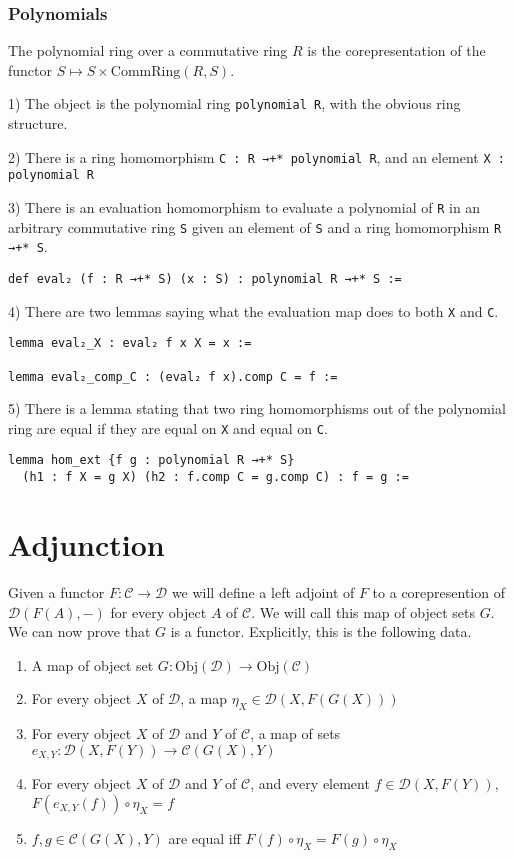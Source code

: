 \documentclass[12pt]{article} %
\theoremstyle{definition}
\theoremstyle{definition}
\theoremstyle{definition}
\theoremstyle{definition}
\begin{document}
\subsubsection{Polynomials}
The polynomial ring over a commutative ring $R$ is the corepresentation of the functor 
$S \mapsto S \times \text{CommRing}(R, S)$.

1) The object is the polynomial ring \lstinline{polynomial R}, with the obvious ring structure.

2) There is a ring homomorphism \lstinline{C : R →+* polynomial R}, and an element 
\lstinline{X : polynomial R}

3) There is an evaluation homomorphism to evaluate a polynomial of \lstinline{R} in 
an arbitrary commutative ring \lstinline{S} given an element of \lstinline{S} and 
a ring homomorphism \lstinline{R →+* S}.
\begin{lstlisting}
def eval₂ (f : R →+* S) (x : S) : polynomial R →+* S :=
\end{lstlisting}

4) There are two lemmas saying what the evaluation map does to both \lstinline{X} and 
\lstinline{C}.
\begin{lstlisting}
lemma eval₂_X : eval₂ f x X = x :=

lemma eval₂_comp_C : (eval₂ f x).comp C = f :=
\end{lstlisting}

5) There is a lemma stating that two ring homomorphisms out of the polynomial ring are 
equal if they are equal on \lstinline{X} and equal on \lstinline{C}.
\begin{lstlisting}
lemma hom_ext {f g : polynomial R →+* S} 
  (h1 : f X = g X) (h2 : f.comp C = g.comp C) : f = g :=
\end{lstlisting}

\section{Adjunction}

Given a functor $F : \mathcal{C} \to \mathcal{D}$ we will define a left adjoint of $F$ to 
a corepresention of $\mathcal{D}(F(A),-)$ for every object $A$ of $\mathcal{C}$. We will call
this map of object sets $G$. We can now prove that $G$ is a functor. Explicitly,
this is the following data.

\begin{enumerate}
  \item A map of object set $G : \text{Obj}(\mathcal{D})\to \text{Obj}(\mathcal{C})$
  \item For every object $X$ of $\mathcal{D}$, a map $\eta_X \in \mathcal{D}(X, F(G(X)))$
  \item For every object $X$ of $\mathcal{D}$ and $Y$ of $\mathcal{C}$, 
    a map of sets $e_{X,Y} : \mathcal{D}(X, F(Y)) \to \mathcal{C}(G(X), Y)$
  \item For every object $X$ of $\mathcal{D}$ and $Y$ of $\mathcal{C}$, 
    and every element $f \in \mathcal{D}(X, F(Y))$, $F(e_{X,Y}(f)) \circ \eta_X = f$
  \item $f,g \in \mathcal{C}(G(X), Y)$ are equal iff $F(f) \circ \eta_X = F(g) \circ \eta_X$
\end{enumerate}
\end{document}
